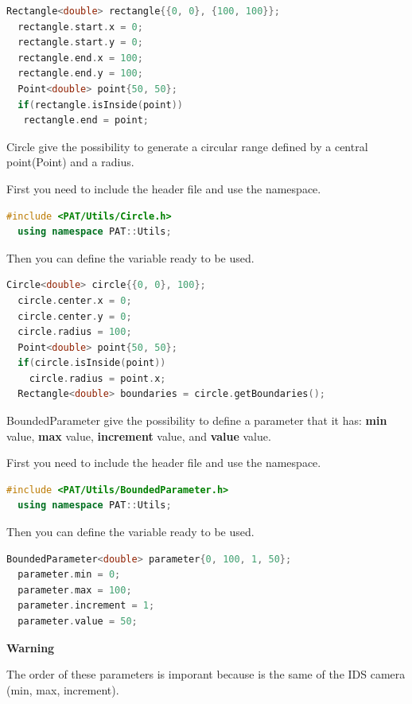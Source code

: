 \begin{lstlisting}[language=c++, gobble=2]
  Rectangle<double> rectangle{{0, 0}, {100, 100}};
  rectangle.start.x = 0;
  rectangle.start.y = 0;
  rectangle.end.x = 100;
  rectangle.end.y = 100;
  Point<double> point{50, 50};
  if(rectangle.isInside(point))
   rectangle.end = point;
\end{lstlisting}


Circle give the possibility to generate a circular range defined by a
central point(Point) and a radius.

First you need to include the header file and use the namespace.

\begin{lstlisting}[language=c++, gobble=2]
  #include <PAT/Utils/Circle.h>
  using namespace PAT::Utils;
\end{lstlisting}

Then you can define the variable ready to be used.

\begin{lstlisting}[language=c++, gobble=2]
  Circle<double> circle{{0, 0}, 100};
  circle.center.x = 0;
  circle.center.y = 0;
  circle.radius = 100;
  Point<double> point{50, 50};
  if(circle.isInside(point))
    circle.radius = point.x;
  Rectangle<double> boundaries = circle.getBoundaries();
\end{lstlisting}


BoundedParameter give the possibility to define a parameter that it has:
\textbf{min} value, \textbf{max} value, \textbf{increment} value, and
\textbf{value} value.

First you need to include the header file and use the namespace.

\begin{lstlisting}[language=c++, gobble=2]
  #include <PAT/Utils/BoundedParameter.h>
  using namespace PAT::Utils;
\end{lstlisting}

Then you can define the variable ready to be used.

\begin{lstlisting}[language=c++, gobble=2]
  BoundedParameter<double> parameter{0, 100, 1, 50};
  parameter.min = 0;
  parameter.max = 100;
  parameter.increment = 1;
  parameter.value = 50;
\end{lstlisting}

\textbf{Warning}

The order of these parameters is imporant because is the same of the IDS
camera (min, max, increment).



